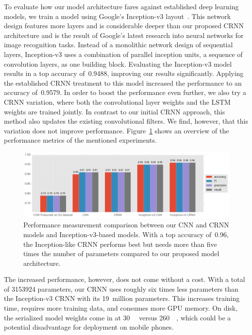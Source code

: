To evaluate how our model architecture fares against established deep learning models, we train a model using Google's Inception-v3 layout~\cite{szegedy2016rethinking}. This network design features more layers and is considerable deeper than our proposed CRNN architecture and is the result of Google's latest research into neural networks for image recognition tasks. Instead of a monolithic network design of sequential layers, Inception-v3 uses a combination of parallel inception units, a sequence of convolution layers, as one building block. Evaluating the Inception-v3 model results in a top accuracy of~\num{0.9488}, improving our results significantly. Applying the established CRNN treatment to this model increased the performance to an accuracy of~\num{0.9579}. In order to boost the performance even further, we also try a CRNN variation, where both the convolutional layer weights and the LSTM weights are trained jointly. In contrast to our initial CRNN approach, this method also updates the existing convolutional filters. We find, however, that this variation does not improve performance. Figure~\ref{fig:news_results} shows an overview of the performance metrics of the mentioned experiments.
%
	\begin{figure}[tp]
  		\centering
    	\includegraphics[width=\textwidth, keepaspectratio]{plots/results_news_plot.pdf}
    	\caption{Performance measurement comparison between our CNN and CRNN models and Inception-v3-based models. With a top accuracy of~\num{0.96}, the Inception-like CRNN performs best but needs more than five times the number of parameters compared to our proposed model architecture.}
    	\label{fig:news_results}
	\end{figure}
%
The increased performance, however, does not come without a cost. With a total of \num{3153924} parameters, our CRNN uses roughly six times less parameters than the Inception-v3 CRNN with its \num{19}~million parameters. This increases training time, requires more training data, and consumes more GPU memory. On disk, the serialized model weights come in at \SI{30}{\mega\byte} versus \SI{260}{\mega\byte}, which could be a potential disadvantage for deployment on mobile phones.



